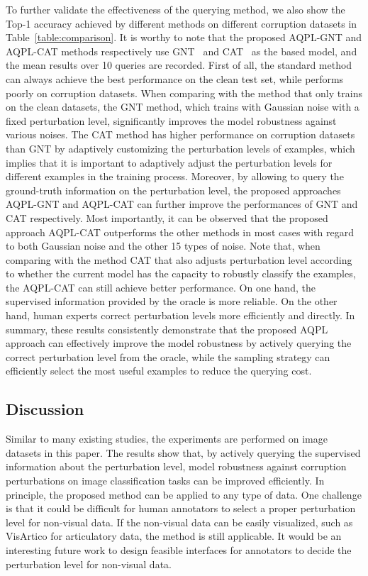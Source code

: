 \documentclass[letterpaper]{article} %
\begin{document}
To further validate the effectiveness of the querying method, we also show the Top-1 accuracy achieved by different methods on different corruption datasets in Table~\ref{table:comparison}. It is worthy to note that the proposed AQPL-GNT and AQPL-CAT methods respectively use GNT~\cite{rusak2020increasing} and CAT~\cite{cheng2020cat} as the based model, and the mean results over 10 queries are recorded. First of all, the standard method can always achieve the best performance on the clean test set, while performs poorly on corruption datasets. When comparing with the method that only trains on the clean datasets, the GNT method, which trains with Gaussian noise with a fixed perturbation level, significantly improves the model robustness against various noises. The CAT method has higher performance on corruption datasets than GNT by adaptively customizing the perturbation levels of examples, which implies that it is important to adaptively adjust the perturbation levels for different examples in the training process. Moreover, by allowing to query the ground-truth information on the perturbation level, the proposed approaches AQPL-GNT and AQPL-CAT can further improve the performances of GNT and CAT respectively. Most importantly, it can be observed that the proposed approach AQPL-CAT outperforms the other methods in most cases with regard to both Gaussian noise and the other 15 types of noise. Note that, when comparing with the method CAT that also adjusts perturbation level according to whether the current model has the capacity to robustly classify the examples, the AQPL-CAT can still achieve better performance. On one hand, the supervised information provided by the oracle is more reliable. On the other hand, human experts correct perturbation levels more efficiently and directly.  In summary, these results consistently demonstrate that the proposed AQPL approach can effectively improve the model robustness by actively querying the correct perturbation level from the oracle, while the sampling strategy can efficiently select the most useful examples to reduce the querying cost.


\subsection{Discussion}

Similar to many existing studies, the experiments are performed on image datasets in this paper. The results show that, by actively querying the supervised information about the perturbation level, model robustness against corruption perturbations on image classification tasks can be improved efficiently. In principle, the proposed method can be applied to any type of data. One challenge is that it could be difficult for human annotators to select a proper perturbation level for non-visual data. If the non-visual data can be easily visualized, such as VisArtico \cite{ouni2012visartico} for articulatory data, the method is still applicable. It would be an interesting future work to design feasible interfaces for annotators to decide the perturbation level for non-visual data.
\end{document}
